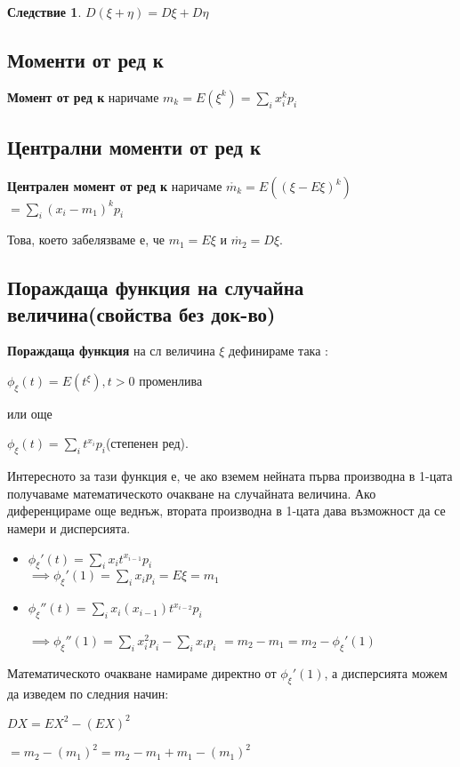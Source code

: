 \documentclass[fleqn,12pt]{article}
\newtheorem*{Corollary}{Следствие}
\begin{document}
\begin{justify}
\begin{Corollary}
    $D(\xi + \eta) = D\xi + D\eta$
\end{Corollary}

\subsection{Моменти от ред к}
\textbf{Момент от ред к} наричаме $m_k = E(\xi^k) = \sum_i x_i^kp_i$

\subsection{Централни моменти от ред к}
\textbf{Централен момент от ред к} наричаме $\mathring{m_k} = E((\xi - E\xi)^k) $
$= \sum_i (x_i-m_1)^kp_i$

Това, което забелязваме е, че $m_1 = E\xi$ и $\mathring{m_2} = D\xi$.

\subsection{Пораждаща функция на случайна величина(свойства без док-во)}
\textbf{Пораждаща функция} на сл величина $\xi$ дефинираме така :

$\phi_\xi(t) = E(t^\xi), t > 0$ променлива

или още 

$\phi_\xi(t) = \sum_i t^{x_i}p_i$(степенен ред).

Интересното за тази функция е, че ако вземем нейната първа производна в 1-цата получаваме математическото очакване на 
случайната величина. Ако диференцираме още веднъж, втората производна в 1-цата дава възможност да се намери и 
дисперсията.
\begin{itemize}
    \item $\phi_\xi'(t) = \sum_{i} x_it^{x_{i-1}}p_i$\\
    $\implies  \phi_\xi'(1) = \sum_{i} x_ip_i = E\xi = m_1$

    \item $\phi_\xi''(t) = \sum_{i} x_i(x_{i-1})t^{x_{i-2}}p_i$
    
    $\implies \phi_\xi''(1)=\sum_{i} x_i^2p_i - \sum_{i} x_ip_i$
    $= m_2 - m_1  = m_2 - \phi_\xi'(1)$
\end{itemize}

Математическото очакване намираме директно от $\phi_\xi'(1)$, а дисперсията можем да изведем по следния начин:

$DX = EX^2 - (EX)^2$

$= m_2 - (m_1)^2 = m_2 - m_1 + m_1 - (m_1)^2 $


\end{justify}
\end{document}
